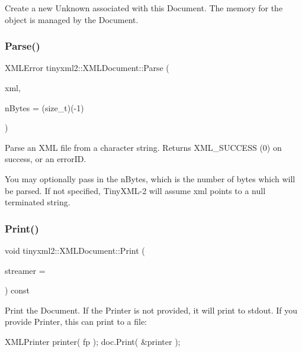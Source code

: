 Create a new Unknown associated with this Document. The memory for the object is managed by the Document. \mbox{\label{classtinyxml2_1_1XMLDocument_a1819bd34f540a7304c105a6232d25a1f}} 
\subsubsection{\texorpdfstring{Parse()}{Parse()}}
{\footnotesize\ttfamily X\+M\+L\+Error tinyxml2\+::\+X\+M\+L\+Document\+::\+Parse (\begin{DoxyParamCaption}\item[{const char $\ast$}]{xml,  }\item[{size\+\_\+t}]{n\+Bytes = {\ttfamily (size\+\_\+t)(-\/1)} }\end{DoxyParamCaption})}

Parse an X\+ML file from a character string. Returns X\+M\+L\+\_\+\+S\+U\+C\+C\+E\+SS (0) on success, or an error\+ID.

You may optionally pass in the \textquotesingle{}n\+Bytes\textquotesingle{}, which is the number of bytes which will be parsed. If not specified, Tiny\+X\+M\+L-\/2 will assume \textquotesingle{}xml\textquotesingle{} points to a null terminated string. \mbox{\label{classtinyxml2_1_1XMLDocument_a867cf5fa3e3ff6ae4847a8b7ee8ec083}} 
\subsubsection{\texorpdfstring{Print()}{Print()}}
{\footnotesize\ttfamily void tinyxml2\+::\+X\+M\+L\+Document\+::\+Print (\begin{DoxyParamCaption}\item[{\mbox{\hyperlink{classtinyxml2_1_1XMLPrinter}{X\+M\+L\+Printer}} $\ast$}]{streamer = {} }\end{DoxyParamCaption}) const}

Print the Document. If the Printer is not provided, it will print to stdout. If you provide Printer, this can print to a file\+: \begin{DoxyVerb}XMLPrinter printer( fp );
doc.Print( &printer );
\end{DoxyVerb}


